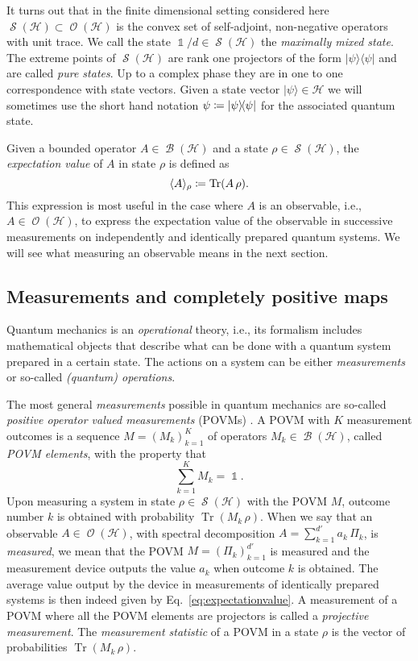 \documentclass[a4paper,12pt,listof=totoc,index=totoc,bibliography=totoc,headsepline=false,headings=normal,BCOR16.153846mm,DIV12,headinclude,twoside,cleardoublepage=empty,numbers=noenddot,final]{scrreprt}
\theoremstyle{mystyle}
\numberwithin{equation}{section}
\numberwithin{figure}{section}
\numberwithin{lemma}{section}
\numberwithin{theorem}{section}
\numberwithin{corollary}{section}
\numberwithin{definition}{section}
\numberwithin{conjecture}{section}
\numberwithin{observation}{section}
\newcommand{\+}{\mkern2mu}
\newcommand{\coloneqq}{\mathrel{\vcentcolon\mkern-1.2mu=}} %
\newcommand{\texteqref}[1]{Eq.~\eqref{#1}}
\newcommand{\bra}[1]{\langle #1|}
\newcommand{\ket}[1]{|#1\rangle}
\newcommand{\ketbra}[2]{\ket{#1}\!\bra{#2}}
\newcommand{\ex}[2]{\langle #1 \rangle_{#2}}
\DeclareMathOperator{\1}{\mathds{1}}
\DeclareMathOperator{\Bop}{\mathcal{B}}
\DeclareMathOperator{\Obs}{\mathcal{O}}
\DeclareMathOperator{\Qst}{\mathcal{S}}
\DeclareMathOperator{\Tr}{Tr}
\newcommand{\mc}[1]{\mathcal{#1}}
\newcommand{\mcH}{\mc{H}}
\begin{document}
It turns out that in the finite dimensional setting considered here $\Qst(\mcH) \subset \Obs(\mcH)$ is the convex set of self-adjoint, non-negative operators with unit trace.
We call the state $\1 / d \in \Qst(\mcH)$ the \emph{maximally mixed state}.
The extreme points of $\Qst(\mcH)$ are rank one projectors of the form $\ketbra\psi\psi$ and are called \emph{pure states}.
Up to a complex phase they are in one to one correspondence with state vectors.
Given a state vector $\ket\psi\in\mcH$ we will sometimes use the short hand notation $\psi \coloneqq \ketbra\psi\psi$ for the associated quantum state.

Given a bounded operator $A \in \Bop(\mcH)$ and a state $\rho \in \Qst(\mcH)$, the \emph{expectation value} of $A$ in state $\rho$ is defined as
\begin{equation} \label{eq:expectationvalue}
 \ex A \rho \coloneqq \Tr(A\,\rho).
\end{equation}
This expression is most useful in the case where $A$ is an observable, i.e., $A \in \Obs(\mcH)$, to express the expectation value of the observable in successive measurements on independently and identically prepared quantum systems.
We will see what measuring an observable means in the next section.


\subsection{Measurements and completely positive maps}
\label{sec:measurementsandcompletelypositivmaps}
%
Quantum mechanics is an \emph{operational} theory, i.e., its formalism includes mathematical objects that describe what can be done with a quantum system prepared in a certain state.
The actions on a system can be either \emph{measurements} or so-called \emph{(quantum) operations}.

The most general \emph{measurements} possible in quantum mechanics are so-called \emph{positive operator valued measurements} (POVMs) \cite{nielsenchuang}.
A POVM with $K$ measurement outcomes is a sequence $M = (M_k)_{k=1}^K$ of operators $M_k \in \Bop(\mcH)$, called \emph{POVM elements}, with the property that
\begin{equation}
  \sum_{k=1}^K M_k = \1 .
\end{equation}
Upon measuring a system in state $\rho \in \Qst(\mcH)$ with the POVM $M$, outcome number $k$ is obtained with probability $\Tr(M_k\,\rho)$.
When we say that an observable $A \in \Obs(\mcH)$, with spectral decomposition $A = \sum_{k=1}^{d'} a_k\,\Pi_k$, is \emph{measured}, we mean that the POVM $M = (\Pi_k)_{k=1}^{d'}$ is measured and the measurement device outputs the value $a_k$ when outcome $k$ is obtained.
The average value output by the device in measurements of identically prepared systems is then indeed given by \texteqref{eq:expectationvalue}.
A measurement of a POVM where all the POVM elements are projectors is called a \emph{projective measurement}.
The \emph{measurement statistic} of a POVM in a state $\rho$ is the vector of probabilities $\Tr(M_k\,\rho)$.
\end{document}
